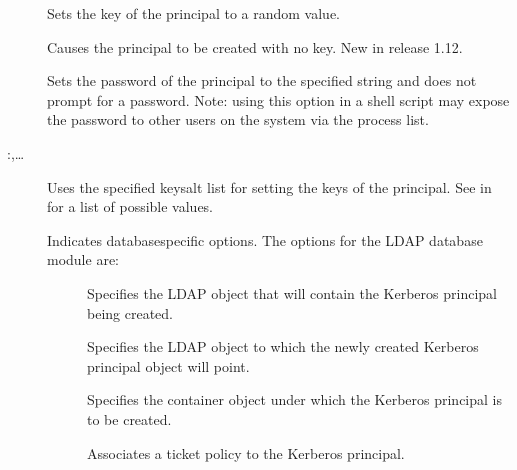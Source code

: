 \documentclass[letterpaper,10pt,english]{sphinxmanual}
\begin{document}
\begin{description}
\item[{}] \leavevmode
\sphinxAtStartPar
Sets the key of the principal to a random value.

\item[{}] \leavevmode
\sphinxAtStartPar
Causes the principal to be created with no key.  New in release
1.12.

\item[{ }] \leavevmode
\sphinxAtStartPar
Sets the password of the principal to the specified string and
does not prompt for a password.  Note: using this option in a
shell script may expose the password to other users on the system
via the process list.

\item[{ :,…}] \leavevmode
\sphinxAtStartPar
Uses the specified keysalt list for setting the keys of the
principal.  See {\hyperref[\detokenize{admin/conf_files/kdc_conf:keysalt-lists}]{}} in {\hyperref[\detokenize{admin/conf_files/kdc_conf:kdc-conf-5}]{}} for a
list of possible values.

\item[{ }] \leavevmode
\sphinxAtStartPar
Indicates database\sphinxhyphen{}specific options.  The options for the LDAP
database module are:
\begin{description}
\item[{}] \leavevmode
\sphinxAtStartPar
Specifies the LDAP object that will contain the Kerberos
principal being created.

\item[{}] \leavevmode
\sphinxAtStartPar
Specifies the LDAP object to which the newly created Kerberos
principal object will point.

\item[{}] \leavevmode
\sphinxAtStartPar
Specifies the container object under which the Kerberos
principal is to be created.

\item[{}] \leavevmode
\sphinxAtStartPar
Associates a ticket policy to the Kerberos principal.


\end{description}
\end{description}
\end{document}
